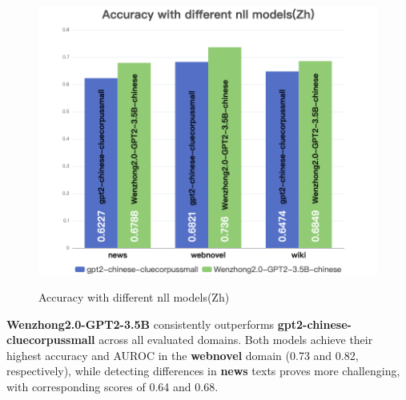 \documentclass[lettersize,journal]{IEEEtran}
\begin{document}
    \begin{figure}[h!]
        \centering
        \includegraphics[width=0.75\linewidth]{images/Accuracy with different nll models(Zh).png}
        \label{fig:enter-label}
        \caption{Accuracy with different nll models(Zh)}
    \end{figure}
    
\textbf{Wenzhong2.0-GPT2-3.5B} consistently outperforms \textbf{gpt2-chinese-cluecorpussmall} across all evaluated domains. Both models achieve their highest accuracy and AUROC in the \textbf{webnovel} domain (0.73 and 0.82, respectively), while detecting differences in \textbf{news} texts proves more challenging, with corresponding scores of 0.64 and 0.68.
\end{document}
